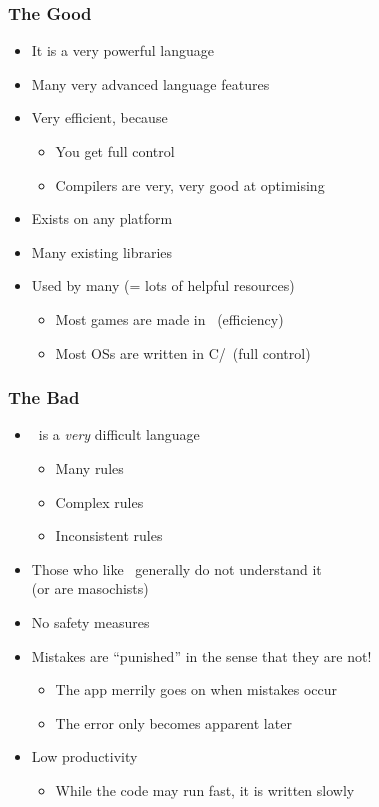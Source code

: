 \begin{frame}
  \frametitle{The Good}
  \begin{itemize}
    \item It is a very powerful language
    \item Many very advanced language features
    \item Very efficient, because
          \begin{itemize}
            \item You get full control
            \item Compilers are very, very good at optimising
          \end{itemize}
    \item Exists on any platform
    \item Many existing libraries
    \item Used by many (= lots of helpful resources)
          \begin{itemize}
            \item Most games are made in \cpp\ (efficiency)
            \item Most OSs are written in C/\cpp\ (full control)
          \end{itemize}
  \end{itemize}
\end{frame}

\begin{frame}
  \frametitle{The Bad}
  \begin{itemize}
    \item \cpp\ is a \emph{very} difficult language
          \begin{itemize}
            \item Many rules
            \item Complex rules
            \item Inconsistent rules
          \end{itemize}
    \item Those who like \cpp\ generally do not understand it \\
          (or are masochists)
    \item No safety measures
    \item Mistakes are ``punished'' in the sense that they are not!
          \begin{itemize}
            \item The app merrily goes on when mistakes occur
            \item The error only becomes apparent later
          \end{itemize}
    \item Low productivity
          \begin{itemize}
            \item While the code may run fast, it is written slowly
          \end{itemize}
  \end{itemize}
\end{frame}

